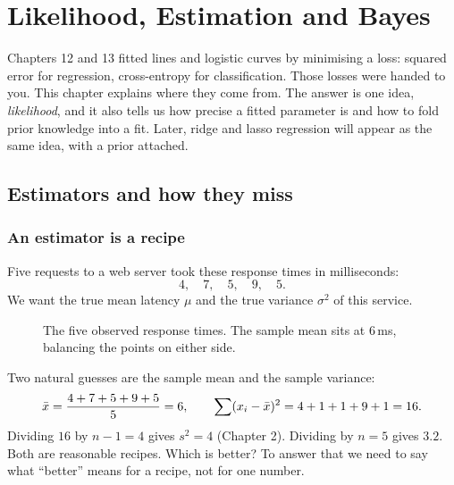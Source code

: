 \chapter{Likelihood, Estimation and Bayes}
\label{ch:likelihood-bayes}

Chapters 12 and 13 fitted lines and logistic curves by minimising a loss: squared
error for regression, cross-entropy for classification. Those losses were handed to
you. This chapter explains where they come from. The answer is one idea,
\emph{likelihood}, and it also tells us how precise a fitted parameter is and how to
fold prior knowledge into a fit. Later, ridge and lasso regression will appear as the same idea, with a prior attached.

\section{Estimators and how they miss}
\label{sec:lik-estimators}

\subsection{An estimator is a recipe}

Five requests to a web server took these response times in milliseconds:
\[
  4,\quad 7,\quad 5,\quad 9,\quad 5 .
\]
We want the true mean latency $\mu$ and the true variance $\sigma^2$ of this service.

\begin{figure}[htbp]
\centering
{}
\caption{The five observed response times. The sample mean sits at $6$\,ms, balancing the points on either side.}
\label{fig:lik-five-points}
\end{figure}

Two natural guesses are the sample mean and the sample variance:
\[
  \bar{x} = \frac{4+7+5+9+5}{5} = 6, \qquad
  \sum (x_i-\bar{x})^2 = 4+1+1+9+1 = 16 .
\]
Dividing $16$ by $n-1=4$ gives $s^2=4$ (Chapter 2). Dividing by $n=5$ gives $3.2$.
Both are reasonable recipes. Which is better? To answer that we need to say what
``better'' means for a recipe, not for one number.

